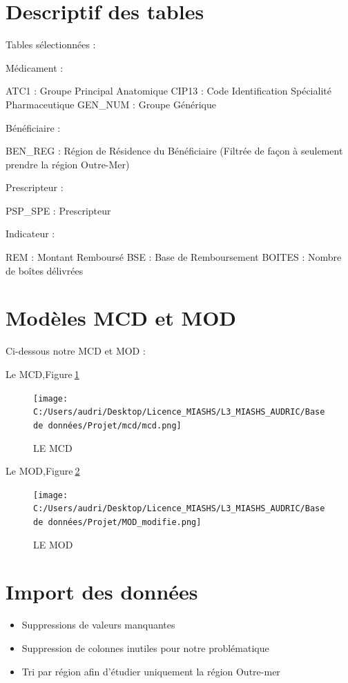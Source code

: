 \documentclass[mstat,12pt]{unswthesis}
\begin{document}
\hypertarget{descriptif-des-tables}{%
\section{Descriptif des tables}\label{descriptif-des-tables}}

Tables sélectionnées :

Médicament :

ATC1 : Groupe Principal Anatomique CIP13 : Code Identification
Spécialité Pharmaceutique GEN\_NUM : Groupe Générique

Bénéficiaire :

BEN\_REG : Région de Résidence du Bénéficiaire (Filtrée de façon à
seulement prendre la région Outre-Mer)

Prescripteur :

PSP\_SPE : Prescripteur

Indicateur :

REM : Montant Remboursé BSE : Base de Remboursement BOITES : Nombre de
boîtes délivrées

\hypertarget{moduxe8les-mcd-et-mod}{%
\section{Modèles MCD et MOD}\label{moduxe8les-mcd-et-mod}}

Ci-dessous notre MCD et MOD : \bigskip

Le MCD,Figure\(~\)\ref{MCD}

\begin{figure}
\hypertarget{MCD}{%
\centering
\texttt{[image: C:/Users/audri/Desktop/Licence\_MIASHS/L3\_MIASHS\_AUDRIC/Base de données/Projet/mcd/mcd.png]}
\caption{LE MCD}\label{MCD}
}
\end{figure}

Le MOD,Figure\(~\)\ref{MOD}

\begin{figure}
\hypertarget{MOD}{%
\centering
\texttt{[image: C:/Users/audri/Desktop/Licence\_MIASHS/L3\_MIASHS\_AUDRIC/Base de données/Projet/MOD\_modifie.png]}
\caption{LE MOD}\label{MOD}
}
\end{figure}

\hypertarget{import-des-donnuxe9es}{%
\section{Import des données}\label{import-des-donnuxe9es}}

\begin{itemize}
\tightlist
\item
  Suppressions de valeurs manquantes
\item
  Suppression de colonnes inutiles pour notre problématique
\item
  Tri par région afin d'étudier uniquement la région Outre-mer
\end{itemize}
\end{document}
